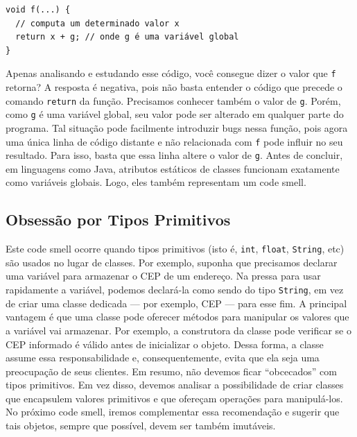 \documentclass[
  11pt,
  twoside]{book}
\newcommand{\passthrough}[1]{#1}
\begin{document}
\begin{lstlisting}
void f(...) {
  // computa um determinado valor x
  return x + g; // onde g é uma variável global
}
\end{lstlisting}

Apenas analisando e estudando esse código, você consegue dizer o valor
que \passthrough{\lstinline!f!} retorna? A resposta é negativa, pois não
basta entender o código que precede o comando
\passthrough{\lstinline!return!} da função. Precisamos conhecer também o
valor de \passthrough{\lstinline!g!}. Porém, como
\passthrough{\lstinline!g!} é uma variável global, seu valor pode ser
alterado em qualquer parte do programa. Tal situação pode facilmente
introduzir bugs nessa função, pois agora uma única linha de código
distante e não relacionada com \passthrough{\lstinline!f!} pode influir
no seu resultado. Para isso, basta que essa linha altere o valor de
\passthrough{\lstinline!g!}. Antes de concluir, em linguagens como Java,
atributos estáticos de classes funcionam exatamente como variáveis
globais. Logo, eles também representam um code smell.

\hypertarget{obsessuxe3o-por-tipos-primitivos}{%
\subsection{Obsessão por Tipos
Primitivos}\label{obsessuxe3o-por-tipos-primitivos}}


Este code smell ocorre quando tipos primitivos (isto é,
\passthrough{\lstinline!int!}, \passthrough{\lstinline!float!},
\passthrough{\lstinline!String!}, etc) são usados no lugar de classes.
Por exemplo, suponha que precisamos declarar uma variável para armazenar
o CEP de um endereço. Na pressa para usar rapidamente a variável,
podemos declará-la como sendo do tipo \passthrough{\lstinline!String!},
em vez de criar uma classe dedicada --- por exemplo, CEP --- para esse
fim. A principal vantagem é que uma classe pode oferecer métodos para
manipular os valores que a variável vai armazenar. Por exemplo, a
construtora da classe pode verificar se o CEP informado é válido antes
de inicializar o objeto. Dessa forma, a classe assume essa
responsabilidade e, consequentemente, evita que ela seja uma preocupação
de seus clientes. Em resumo, não devemos ficar ``obcecados'' com tipos
primitivos. Em vez disso, devemos analisar a possibilidade de criar
classes que encapsulem valores primitivos e que ofereçam operações para
manipulá-los. No próximo code smell, iremos complementar essa
recomendação e sugerir que tais objetos, sempre que possível, devem ser
também imutáveis.
\end{document}

